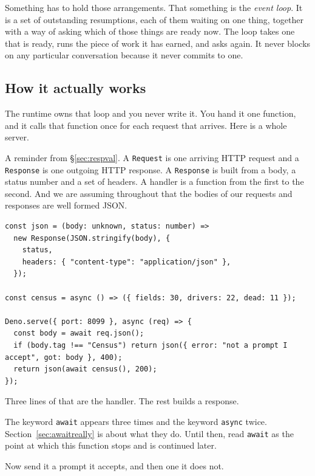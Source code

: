 \documentclass[11pt,a4paper]{article}
\begin{document}
Something has to hold those arrangements. That something is the \emph{event loop}. It is a set of
outstanding resumptions, each of them waiting on one thing, together with a way of asking which of
those things are ready now. The loop takes one that is ready, runs the piece of work it has earned,
and asks again. It never blocks on any particular conversation because it never commits to one.

\newpage

\subsection{How it actually works}

The runtime owns that loop and you never write it. You hand it one function, and it calls that
function once for each request that arrives. Here is a whole server.

\begin{orestisbox}
A reminder from \S\ref{sec:respval}. A \texttt{Request} is one arriving HTTP request and a
\texttt{Response} is one outgoing HTTP response. A \texttt{Response} is built from a body, a status
number and a set of headers. A handler is a function from the first to the second. And we are
assuming throughout that the bodies of our requests and responses are well formed JSON.
\end{orestisbox}

\begin{lstlisting}[language=TS]
const json = (body: unknown, status: number) =>
  new Response(JSON.stringify(body), {
    status,
    headers: { "content-type": "application/json" },
  });

const census = async () => ({ fields: 30, drivers: 22, dead: 11 });

Deno.serve({ port: 8099 }, async (req) => {
  const body = await req.json();
  if (body.tag !== "Census") return json({ error: "not a prompt I accept", got: body }, 400);
  return json(await census(), 200);
});
\end{lstlisting}

Three lines of that are the handler. The rest builds a response.

The keyword \texttt{await} appears three times and the keyword \texttt{async} twice.
Section~\ref{sec:awaitreally} is about what they do. Until then, read \texttt{await} as the point at
which this function stops and is continued later.

Now send it a prompt it accepts, and then one it does not.
\end{document}
